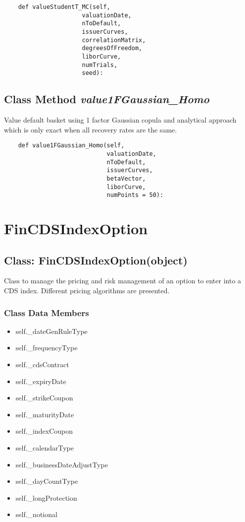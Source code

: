 \documentclass[twoside,11pt]{book}
\begin{document}
\begin{lstlisting}
    def valueStudentT_MC(self, 
                      valuationDate,
                      nToDefault,
                      issuerCurves,
                      correlationMatrix,
                      degreesOfFreedom,
                      liborCurve,
                      numTrials,
                      seed):
\end{lstlisting}

\subsection{Class Method {\it value1FGaussian\_Homo}}
Value default basket using 1 factor Gaussian copula and analytical approach which is only exact when all recovery rates are the same. 

\begin{lstlisting}
    def value1FGaussian_Homo(self, 
                             valuationDate,
                             nToDefault,
                             issuerCurves, 
                             betaVector, 
                             liborCurve,
                             numPoints = 50):
\end{lstlisting}

\newpage
\section{FinCDSIndexOption}

\subsection{Class: FinCDSIndexOption(object)}
Class to manage the pricing and risk management of an option to enter into a CDS index. Different pricing algorithms are presented. 

\subsubsection{Class Data Members}
\begin{itemize}
\item{self.\_dateGenRuleType}
\item{self.\_frequencyType}
\item{self.\_cdsContract}
\item{self.\_expiryDate}
\item{self.\_strikeCoupon}
\item{self.\_maturityDate}
\item{self.\_indexCoupon}
\item{self.\_calendarType}
\item{self.\_businessDateAdjustType}
\item{self.\_dayCountType}
\item{self.\_longProtection}
\item{self.\_notional}
\end{itemize}
\end{document}

